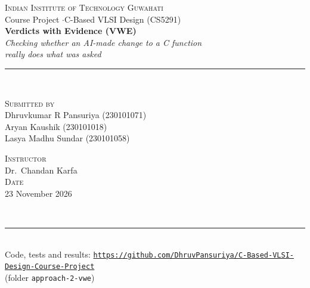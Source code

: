 \documentclass[10pt,a4paper]{article}
\begin{document}
\thispagestyle{empty}
\vspace*{\fill}
\begin{center}
{\large\scshape\color{ink} Indian Institute of Technology Guwahati}\\[2pt]
{\small\color{black!70} Course Project \quad$\cdot$\quad C-Based VLSI Design (CS5291)}\\[14pt]
\vspace{14pt}
{\fontsize{30}{36}\selectfont\bfseries\color{ink} Verdicts with Evidence (VWE)}\\[10pt]
{\Large\itshape\color{acc} Checking whether an AI-made change to a C function\\[2pt] really does what was asked}\\[10pt]
{\color{ink}\rule{0.8\linewidth}{0.6pt}}\\[16pt]
\begin{minipage}[t]{0.48\linewidth}\centering
{\small\scshape\color{acc} Submitted by}\\[4pt]
Dhruvkumar R Pansuriya (230101071)\\
Aryan Kaushik (230101018)\\
Lasya Madhu Sundar (230101058)
\end{minipage}\hfill
\begin{minipage}[t]{0.48\linewidth}\centering
{\small\scshape\color{acc} Instructor}\\[4pt]
Dr.\ Chandan Karfa\\[10pt]
{\small\scshape\color{acc} Date}\\[4pt]
23 November 2026
\end{minipage}\\[16pt]
{\color{black!30}\rule{0.6\linewidth}{0.4pt}}\\[6pt]
{\small Code, tests and results:
\href{https://github.com/DhruvPansuriya/C-Based-VLSI-Design-Course-Project/tree/main/approach-2-vwe}{\nolinkurl{https://github.com/DhruvPansuriya/C-Based-VLSI-Design-Course-Project}}\\
(folder \texttt{approach-2-vwe})}
\end{center}
\vspace{2pt}
\end{document}
